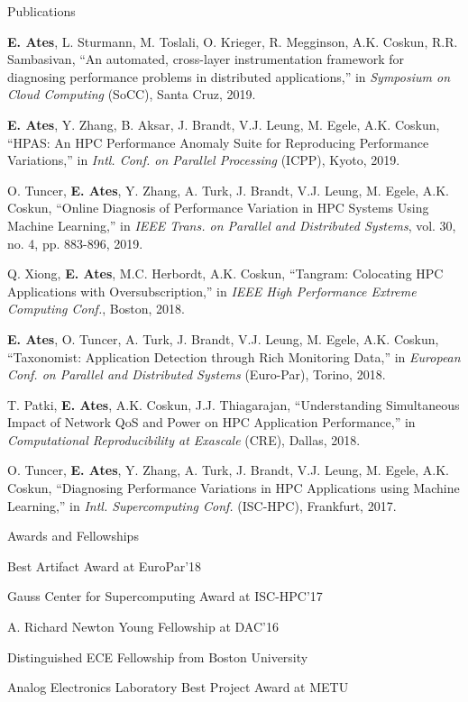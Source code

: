 \documentclass{resume}
\begin{document}
\begin{rSection}{Publications} \itemsep -3pt
\item \textbf{E. Ates}, L. Sturmann, M. Toslali, O. Krieger, R. Megginson, A.K.
Coskun, R.R. Sambasivan, ``An automated, cross-layer instrumentation framework
for diagnosing performance problems in distributed applications,'' in
\textit{Symposium on Cloud Computing} (SoCC), Santa Cruz, 2019.

\item \textbf{E. Ates}, Y. Zhang, B. Aksar, J. Brandt, V.J. Leung, M.
Egele, A.K. Coskun, ``HPAS: An HPC Performance Anomaly Suite for Reproducing
Performance Variations,'' in \textit{Intl. Conf. on Parallel Processing}
(ICPP), Kyoto, 2019.

\item O. Tuncer, \textbf{E. Ates}, Y. Zhang, A. Turk, J. Brandt, V.J. Leung, M.
Egele, A.K. Coskun, ``Online Diagnosis of Performance Variation in HPC Systems
Using Machine Learning,'' in \textit{IEEE Trans. on Parallel and
  Distributed Systems}, vol. 30, no. 4, pp. 883-896, 2019.

\item Q. Xiong, \textbf{E. Ates}, M.C. Herbordt, A.K. Coskun, ``Tangram: Colocating
HPC Applications with Oversubscription,'' in \textit{IEEE High Performance
  Extreme Computing Conf.}, Boston, 2018.

\item \textbf{E. Ates}, O. Tuncer, A. Turk, J. Brandt, V.J. Leung, M. Egele, A.K.
Coskun, ``Taxonomist: Application Detection through Rich Monitoring Data,'' in
\textit{European Conf. on Parallel and Distributed Systems} (Euro-Par),
Torino, 2018.

\item T. Patki, \textbf{E. Ates}, A.K. Coskun, J.J. Thiagarajan, ``Understanding
Simultaneous Impact of Network QoS and Power on HPC Application Performance,''
in \textit{Computational Reproducibility at Exascale} (CRE), Dallas, 2018.

\item O. Tuncer, \textbf{E. Ates}, Y. Zhang, A. Turk, J. Brandt, V.J. Leung, M.
Egele, A.K. Coskun, ``Diagnosing Performance Variations in HPC Applications
using Machine Learning,'' in \textit{Intl. Supercomputing Conf.} (ISC-HPC),
Frankfurt, 2017.

\end{rSection}

\begin{rSection}{Awards and Fellowships} \itemsep -3pt
  \item Best Artifact Award at EuroPar'18
  \item Gauss Center for Supercomputing Award at ISC-HPC'17
  \item A. Richard Newton Young Fellowship at DAC'16
  \item Distinguished ECE Fellowship from Boston University
  \item Analog Electronics Laboratory Best Project Award at METU
\end{rSection}
\end{document}
